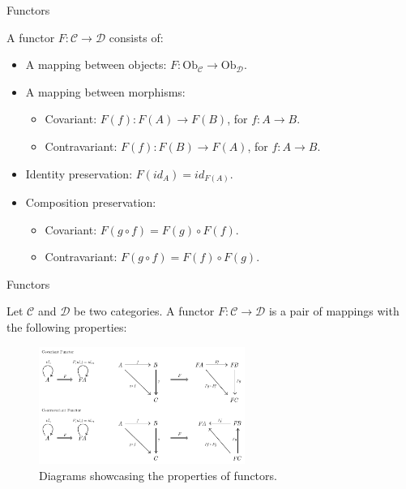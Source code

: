 \documentclass[aspectratio=169,xcolor=dvipsnames,10pt]{beamer}
\theoremstyle{definition}
\begin{document}
\begin{frame}[fragile]{Functors}
	\begin{definition}[Functor]
        A functor $F: \mathcal C \to \mathcal D$ consists of:
        \begin{itemize}
            \item A mapping between objects: $F: \text{Ob}_\mathcal C \to \text{Ob}_\mathcal D$.
            \item A mapping between morphisms:
            \begin{itemize}
                \item Covariant: $F(f): F(A) \to F(B)$, for $f: A \to B$.
                \item Contravariant: $F(f): F(B) \to F(A)$, for $f: A \to B$.
            \end{itemize}
            \item Identity preservation: $F(id_A) = id_{F(A)}$.
            \item Composition preservation: 
            \begin{itemize}
                \item Covariant: $F(g \circ f) = F(g) \circ F(f)$.
                \item Contravariant: $F(g \circ f) = F(f) \circ F(g)$.
            \end{itemize}
        \end{itemize}
    \end{definition}
\end{frame}


\begin{frame}[fragile]{Functors}
	\begin{definition}[Functor]
		Let $\mathcal C$ and $\mathcal D$ be two categories. A functor $F: \mathcal C \to \mathcal D$ is
		a pair of mappings with the following properties:
		\begin{figure}[H]
			\begin{center}
				\includegraphics[width=0.6\textwidth]{./figs/Functor.pdf}
			\end{center}
			\caption{Diagrams showcasing the properties of functors.}
			\label{fig:Functor}
		\end{figure}
	\end{definition}

\end{frame}
\end{document}
